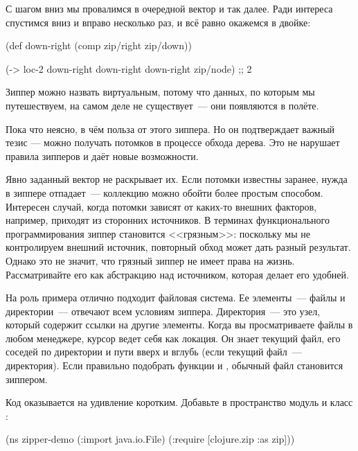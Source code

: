 С шагом вниз мы провалимся в очередной вектор \code{[1 2 3]} и так далее. Ради
интереса спустимся вниз и вправо несколько раз, и всё равно окажемся в двойке:

\begin{english}
  \begin{clojure}
(def down-right (comp zip/right zip/down))

(-> loc-2
    down-right
    down-right
    down-right
    zip/node)
;; 2
  \end{clojure}
\end{english}

Зиппер можно назвать виртуальным, потому что данных, по которым мы путешествуем,
на самом деле не существует~--- они появляются в полёте.

Пока что неясно, в чём польза от этого зиппера. Но он подтверждает важный тезис
— можно получать потомков в процессе обхода дерева. Это не нарушает правила
зипперов и даёт новые возможности.

Явно заданный вектор \code{[1 2 3]} не раскрывает их. Если потомки известны заранее,
нужда в зиппере отпадает~--- коллекцию можно обойти более простым
способом. Интересен случай, когда потомки зависят от каких-то внешних факторов,
например, приходят из сторонних источников. В терминах функционального
программирования зиппер становится <<грязным>>: поскольку мы не контролируем
внешний источник, повторный обход может дать разный результат. Однако это не
значит, что грязный зиппер не имеет права на жизнь. Рассматривайте его как
абстракцию над источником, которая делает его удобней.

На роль примера отлично подходит файловая система. Ее элементы~--- файлы и
директории~--- отвечают всем условиям зиппера. Директория~--- это узел, который
содержит ссылки на другие элементы. Когда вы просматриваете файлы в любом
менеджере, курсор ведет себя как локация. Он знает текущий файл, его соседей по
директории и пути вверх и вглубь (если текущий файл~--- директория). Если
правильно подобрать функции  и , обычный файл становится
зиппером.

Код оказывается на удивление коротким. Добавьте в пространство модуль
 и класс :

\begin{english}
  \begin{clojure}
(ns zipper-demo
  (:import java.io.File)
  (:require
   [clojure.zip :as zip]))
  \end{clojure}
\end{english}

